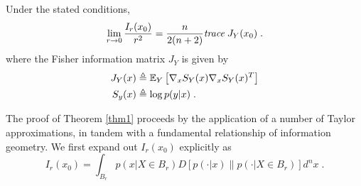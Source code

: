 	\begin{thm} \label{thm1}
		Under the stated conditions, 
		\begin{equation}
			\lim_{r\rightarrow 0} \frac{I_r(x_0)}{r^2} = \frac{n}{2(n+2)} \emph{trace}\; J_Y(x_0)\;.
		\end{equation}
		where the Fisher information matrix $J_Y$ is given by 
		\begin{align}
		J_Y(x) &\triangleq \mathbb{E}_Y\left[\nabla_x S_{Y}(x)\nabla_x S_{Y}(x)^T \right] \\
		S_y(x) &\triangleq \log p(y|x)\;.
	\end{align}
	\end{thm}

	The proof of Theorem \ref{thm1} proceeds by the application of a number of Taylor approximations, in tandem with a fundamental relationship of information geometry. We first expand out $I_r(x_0)$ explicitly as
	\begin{equation}
		I_r(x_0) = \int_{B_r} p(x|X \in B_r) D[p(\cdot|x)\| p(\cdot|X \in B_r)] d^n x\;. \label{eq:explicit}
	\end{equation}

